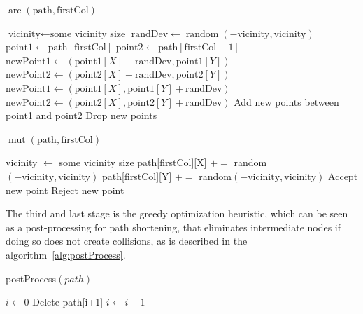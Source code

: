 \begin{algorithm}[ht]
    \caption{$\operatorname{arc}(\text{path}, \text{firstCol})$}
    \label{alg:arc}
    \begin{algorithmic}[1]
        \STATE \(\text{vicinity} \leftarrow \text{some vicinity size}\)
        \STATE \(\text{randDev} \leftarrow \operatorname{random}(-\text{vicinity},\text{vicinity})\)
        \STATE \(\text{point1} \leftarrow \text{path}[\text{firstCol}]\)
        \STATE \(\text{point2} \leftarrow \text{path}[\text{firstCol}+1]\)
            \STATE \(\text{newPoint1} \leftarrow (\text{point1}[X]+\text{randDev},\text{point1}[Y])\)
            \STATE \(\text{newPoint2} \leftarrow (\text{point2}[X]+\text{randDev},\text{point2}[Y])\)
        \ELSE
            \STATE \(\text{newPoint1} \leftarrow (\text{point1}[X],\text{point1}[Y]+\text{randDev})\)
            \STATE \(\text{newPoint2} \leftarrow (\text{point2}[X],\text{point2}[Y]+\text{randDev})\)
        \ENDIF
            \STATE Add new points between point1 and point2
        \ELSE
            \STATE Drop new points
        \ENDIF
    \end{algorithmic}
\end{algorithm}

\begin{algorithm}[ht]
    \caption{$\operatorname{mut}(\text{path}, \text{firstCol})$}
    \label{alg:mut}
    \begin{algorithmic}[1]
        \STATE vicinity $\leftarrow$ some vicinity size
        \STATE path[firstCol][X] $+=$ random$(-\text{vicinity}, \text{vicinity})$
        \STATE path[firstCol][Y] $+=$ random$(-\text{vicinity}, \text{vicinity})$
            \STATE Accept new point
        \ELSE
            \STATE Reject new point
        \ENDIF
    \end{algorithmic}
\end{algorithm}

The third and last stage is the greedy optimization heuristic,
which can be seen as a post-processing for path shortening, that
eliminates intermediate nodes if doing so does not create collisions,
as is described in the algorithm~\ref{alg:postProcess}.

\begin{algorithm}[ht]
    \caption{postProcess$(path)$}
    \label{alg:postProcess}
    \begin{algorithmic}[1]
        \STATE \(i \leftarrow 0\)
                \STATE Delete path[i+1]
            \ELSE
                \STATE \(i \leftarrow i + 1\)
            \ENDIF
        \ENDWHILE
    \end{algorithmic}
\end{algorithm}

